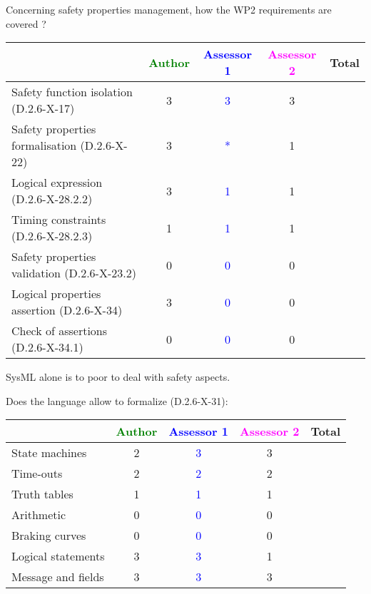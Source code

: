 Concerning safety properties management, how the WP2 requirements are covered ?

\begin{tabular}{|l | c | c | c | c|}
\hline
& \textcolor{green}{Author} & \textcolor{blue}{Assessor 1} & \textcolor{magenta}{Assessor 2} & Total \\
\hline
Safety function isolation (D.2.6-X-17) & 3 & \textcolor{blue}{3} & 3 & \\
\hline
Safety properties formalisation (D.2.6-X-22) & 3 & \textcolor{blue}{*} & 1 & \\
\hline
Logical expression (D.2.6-X-28.2.2) & 3 & \textcolor{blue}{1} & 1 & \\
\hline
Timing constraints (D.2.6-X-28.2.3) & 1 & \textcolor{blue}{1} & 1 & \\
\hline
Safety properties validation (D.2.6-X-23.2) & 0 & \textcolor{blue}{0} & 0 & \\
\hline
Logical properties assertion (D.2.6-X-34) & 3 & \textcolor{blue}{0} & 0 & \\
\hline
Check of assertions (D.2.6-X-34.1) & 0 & \textcolor{blue}{0} &  0 & \\
\hline
\end{tabular}




\begin{assessor2}
SysML alone is to  poor to deal with safety aspects.
\end{assessor2}


Does the language allow to formalize (D.2.6-X-31):

\begin{tabular}{|l | c | c | c | c|}
\hline
& \textcolor{green}{Author} & \textcolor{blue}{Assessor 1} & \textcolor{magenta}{Assessor 2} & Total \\
\hline
State machines & 2 & \textcolor{blue}{3} & 3 & \\
\hline
Time-outs & 2 & \textcolor{blue}{2} & 2 & \\
\hline
Truth tables & 1 & \textcolor{blue}{1} & 1 & \\
\hline
Arithmetic & 0 & \textcolor{blue}{0} & 0 & \\
\hline
Braking curves & 0 & \textcolor{blue}{0} & 0 & \\
\hline
Logical statements & 3 & \textcolor{blue}{3} & 1 & \\
\hline
Message and fields & 3 & \textcolor{blue}{3} & 3 & \\
\hline
\end{tabular}

